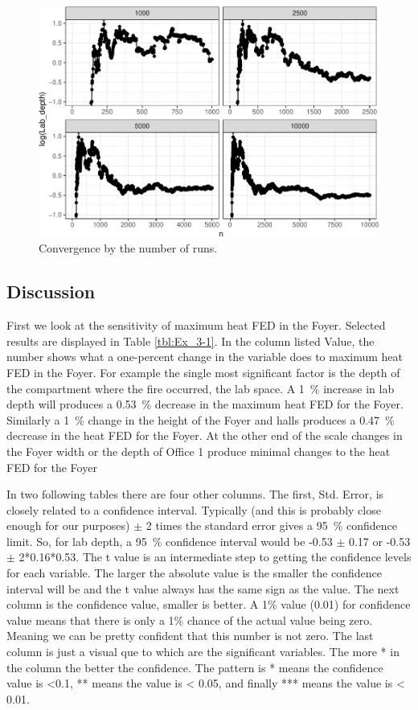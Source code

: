 \documentclass[12pt,twoside]{book}
\begin{document}
\begin{figure}[h!]
\centering
\includegraphics[width=4.5in]{FIGURES/ex2_cvg_plot-1.pdf}
\caption{Convergence by the number of runs.}
\label{Ex_3-convergence_of_mean}
\end{figure}


\subsection{Discussion}\label{discussion_3}

First we look at the sensitivity of maximum heat FED in the Foyer. Selected results are displayed in Table \ref{tbl:Ex_3-1}. In the column listed Value, the number shows what a one-percent change in the variable does to maximum heat FED in the Foyer. For example the single most significant factor is the depth of the compartment where the fire occurred, the lab space.  A 1~\% increase in lab depth will produces a 0.53~\% decrease in the maximum heat FED for the Foyer. Similarly a 1~\% change in the height of the Foyer and halls produces a 0.47~\% decrease in the heat FED for the Foyer. At the other end of the scale changes in the Foyer width or the depth of Office 1 produce minimal changes to the heat FED for the Foyer

In two following tables there are four other columns. The first, Std. Error, is closely related to a confidence interval. Typically (and this is probably close enough for our purposes) $\pm$ 2 times the standard error gives a 95~\% confidence limit. So, for lab depth, a 95~\% confidence interval would be -0.53 $\pm$ 0.17 or -0.53 $\pm$ 2*0.16*0.53. The t value is an intermediate step to getting the confidence levels for each variable. The larger the absolute value is the smaller the confidence interval will be and the t value always has the same sign as the value. The next column is the confidence value, smaller is better. A 1\% value (0.01) for confidence value means that there is only a 1\% chance of the actual value being zero. Meaning we can be pretty confident that this number is not zero. The last column is just a visual que to which are the significant variables. The more * in the column the better the confidence. The pattern is * means the confidence value is <0.1, ** means the value is < 0.05, and finally *** means the value is < 0.01.
\end{document}
